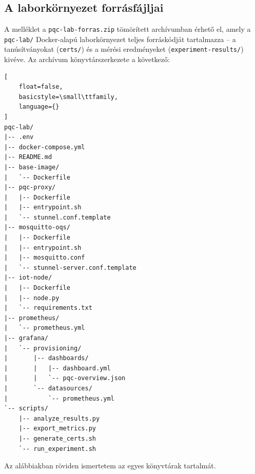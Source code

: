 \appendix
\chapter*{\fuggelek}
\setcounter{chapter}{\appendixnumber}



\newpage
\section{A laborkörnyezet forrásfájljai}

A melléklet a \texttt{pqc-lab-forras.zip} tömörített archívumban érhető el, amely a \texttt{pqc-lab/} Docker-alapú laborkörnyezet teljes forráskódját tartalmazza -- a tanúsítványokat (\texttt{certs/}) és a mérési eredményeket (\texttt{experiment-results/}) kivéve. Az archívum könyvtárszerkezete a következő:

\begin{lstlisting}[
    float=false,
    basicstyle=\small\ttfamily,
    language={}
]
pqc-lab/
|-- .env
|-- docker-compose.yml
|-- README.md
|-- base-image/
|   `-- Dockerfile
|-- pqc-proxy/
|   |-- Dockerfile
|   |-- entrypoint.sh
|   `-- stunnel.conf.template
|-- mosquitto-oqs/
|   |-- Dockerfile
|   |-- entrypoint.sh
|   |-- mosquitto.conf
|   `-- stunnel-server.conf.template
|-- iot-node/
|   |-- Dockerfile
|   |-- node.py
|   `-- requirements.txt
|-- prometheus/
|   `-- prometheus.yml
|-- grafana/
|   `-- provisioning/
|       |-- dashboards/
|       |   |-- dashboard.yml
|       |   `-- pqc-overview.json
|       `-- datasources/
|           `-- prometheus.yml
`-- scripts/
    |-- analyze_results.py
    |-- export_metrics.py
    |-- generate_certs.sh
    `-- run_experiment.sh
\end{lstlisting}

Az alábbiakban röviden ismertetem az egyes könyvtárak tartalmát.

